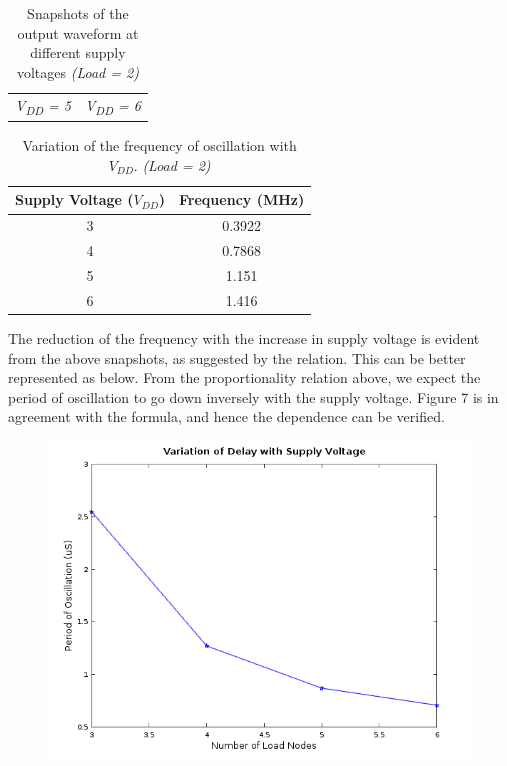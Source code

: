\documentclass[a4paper, 11pt]{article}
\begin{document}
\begin{table}[H]
\begin{tabular}{ c  c }
      \em V\textsubscript{DD} = 5 & \em V\textsubscript{DD} = 6 \\
  \end{tabular}
 \caption{Snapshots of the output waveform at different supply voltages {\em(Load = 2)}}
\end{table}

\begin{table}[H]
\centering
\begin{tabular}{| c | c |}
\hline
\bf Supply Voltage ($V_{DD}$) & \bf Frequency (MHz)\\
\hline
3 & 0.3922 \\
4 & 0.7868 \\
5 & 1.151 \\
6 & 1.416 \\
\hline
\end{tabular}
\caption{Variation of the frequency of oscillation with $V_{DD}$. {\em(Load = 2)}}
\end{table}

The reduction of the frequency with the increase in supply voltage is evident from the above snapshots, as suggested by the relation. This can be better represented as below. From the proportionality relation above, we expect the period of oscillation to go down inversely with the supply voltage. Figure 7 is in agreement with the formula, and hence the dependence can be verified.

\begin{figure}[H]
\centering
\includegraphics[scale=0.6]{Delay_Supply}
\caption{}
\end{figure}
\end{document}
